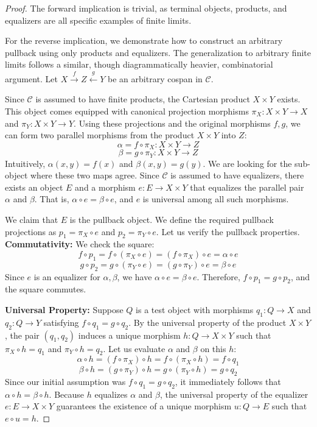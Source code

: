 \begin{proof}
The forward implication is trivial, as terminal objects, products, and equalizers are all specific examples of finite limits. 

For the reverse implication, we demonstrate how to construct an arbitrary pullback using only products and equalizers. The generalization to arbitrary finite limits follows a similar, though diagrammatically heavier, combinatorial argument.
Let $X \xrightarrow{f} Z \xleftarrow{g} Y$ be an arbitrary cospan in $\mathcal{C}$.

Since $\mathcal{C}$ is assumed to have finite products, the Cartesian product $X \times Y$ exists. This object comes equipped with canonical projection morphisms $\pi_X: X \times Y \to X$ and $\pi_Y: X \times Y \to Y$.
Using these projections and the original morphisms $f, g$, we can form two parallel morphisms from the product $X \times Y$ into $Z$:
\[
\alpha = f \circ \pi_X : X \times Y \to Z
\]
\[
\beta = g \circ \pi_Y : X \times Y \to Z
\]
Intuitively, $\alpha(x,y) = f(x)$ and $\beta(x,y) = g(y)$. We are looking for the sub-object where these two maps agree. 
Since $\mathcal{C}$ is assumed to have equalizers, there exists an object $E$ and a morphism $e: E \to X \times Y$ that equalizes the parallel pair $\alpha$ and $\beta$. That is, $\alpha \circ e = \beta \circ e$, and $e$ is universal among all such morphisms.

We claim that $E$ is the pullback object. We define the required pullback projections as $p_1 = \pi_X \circ e$ and $p_2 = \pi_Y \circ e$. Let us verify the pullback properties.
\textbf{Commutativity:} We check the square:
\[
f \circ p_1 = f \circ (\pi_X \circ e) = (f \circ \pi_X) \circ e = \alpha \circ e
\]
\[
g \circ p_2 = g \circ (\pi_Y \circ e) = (g \circ \pi_Y) \circ e = \beta \circ e
\]
Since $e$ is an equalizer for $\alpha, \beta$, we have $\alpha \circ e = \beta \circ e$. Therefore, $f \circ p_1 = g \circ p_2$, and the square commutes.

\textbf{Universal Property:} Suppose $Q$ is a test object with morphisms $q_1: Q \to X$ and $q_2: Q \to Y$ satisfying $f \circ q_1 = g \circ q_2$.
By the universal property of the product $X \times Y$, the pair $(q_1, q_2)$ induces a unique morphism $h: Q \to X \times Y$ such that $\pi_X \circ h = q_1$ and $\pi_Y \circ h = q_2$.
Let us evaluate $\alpha$ and $\beta$ on this $h$:
\[
\alpha \circ h = (f \circ \pi_X) \circ h = f \circ (\pi_X \circ h) = f \circ q_1
\]
\[
\beta \circ h = (g \circ \pi_Y) \circ h = g \circ (\pi_Y \circ h) = g \circ q_2
\]
Since our initial assumption was $f \circ q_1 = g \circ q_2$, it immediately follows that $\alpha \circ h = \beta \circ h$.
Because $h$ equalizes $\alpha$ and $\beta$, the universal property of the equalizer $e: E \to X \times Y$ guarantees the existence of a unique morphism $u: Q \to E$ such that $e \circ u = h$.


\end{proof}
